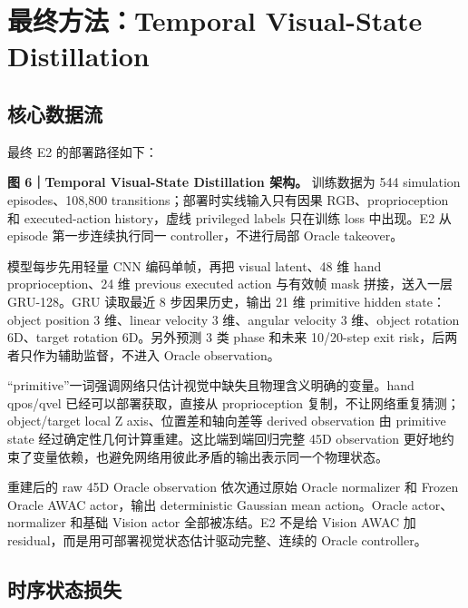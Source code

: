 \hypertarget{ux6700ux7ec8ux65b9ux6cd5temporal-visual-state-distillation}{%
\section{最终方法：Temporal Visual-State Distillation}\label{ux6700ux7ec8ux65b9ux6cd5temporal-visual-state-distillation}}

\hypertarget{ux6838ux5fc3ux6570ux636eux6d41}{%
\subsection{核心数据流}\label{ux6838ux5fc3ux6570ux636eux6d41}}

最终 E2 的部署路径如下：



\textbf{图 6｜Temporal Visual-State Distillation 架构。} 训练数据为 544 simulation episodes、108,800 transitions；部署时实线输入只有因果 RGB、proprioception 和 executed-action history，虚线 privileged labels 只在训练 loss 中出现。E2 从 episode 第一步连续执行同一 controller，不进行局部 Oracle takeover。

模型每步先用轻量 CNN 编码单帧，再把 visual latent、48 维 hand proprioception、24 维 previous executed action 与有效帧 mask 拼接，送入一层 GRU-128。GRU 读取最近 8 步因果历史，输出 21 维 primitive hidden state：object position 3 维、linear velocity 3 维、angular velocity 3 维、object rotation 6D、target rotation 6D。另外预测 3 类 phase 和未来 10/20-step exit risk，后两者只作为辅助监督，不进入 Oracle observation。

``primitive''一词强调网络只估计视觉中缺失且物理含义明确的变量。hand qpos/qvel 已经可以部署获取，直接从 proprioception 复制，不让网络重复猜测；object/target local Z axis、位置差和轴向差等 derived observation 由 primitive state 经过确定性几何计算重建。这比端到端回归完整 45D observation 更好地约束了变量依赖，也避免网络用彼此矛盾的输出表示同一个物理状态。

重建后的 raw 45D Oracle observation 依次通过原始 Oracle normalizer 和 Frozen Oracle AWAC actor，输出 deterministic Gaussian mean action。Oracle actor、normalizer 和基础 Vision actor 全部被冻结。E2 不是给 Vision AWAC 加 residual，而是用可部署视觉状态估计驱动完整、连续的 Oracle controller。

\hypertarget{ux65f6ux5e8fux72b6ux6001ux635fux5931}{%
\subsection{时序状态损失}\label{ux65f6ux5e8fux72b6ux6001ux635fux5931}}

